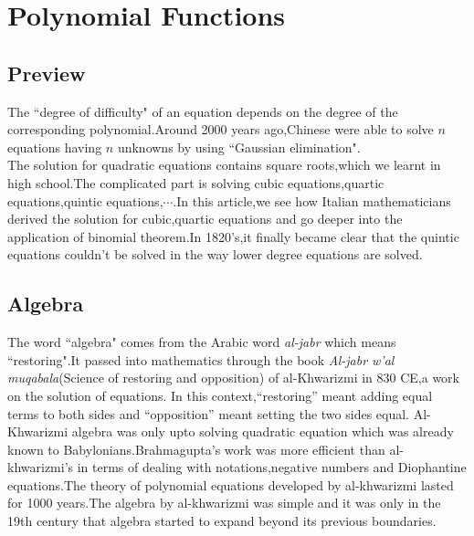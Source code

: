 \documentclass[a4paper,reqno,11pt]{book}
\theoremstyle{plain}%
\theoremstyle{definition}
\begin{document}
\chapter{Polynomial Functions}
\section{Preview}
\noindent The ``degree of difficulty" of an equation depends on the degree of the corresponding polynomial.Around 2000 years ago,Chinese were able to solve $n$ equations having $n$ unknowns by using ``Gaussian elimination".\\
The solution for quadratic equations contains square roots,which we learnt in high school.The complicated part is solving cubic equations,quartic equations,quintic equations,$\cdots$.In this article,we see how Italian mathematicians derived the solution for cubic,quartic equations and go deeper into the application of binomial theorem.In 1820's,it finally became clear that the quintic equations couldn't be solved in the way lower degree equations are solved.
\section{Algebra}
The word ``algebra" comes from the Arabic word \textit{al-jabr} which means ``restoring".It passed into mathematics through the book \textit{Al-jabr w'al muqabala}(Science of restoring and opposition) of al-Khwarizmi in 830 CE,a work on the solution of equations. In this context,``restoring” meant adding equal terms to both sides and ``opposition” meant setting the two sides equal.
Al-Khwarizmi algebra was only upto solving quadratic equation which was already known to Babylonians.Brahmagupta's work was more efficient than al-khwarizmi's in terms of dealing with notations,negative numbers and Diophantine equations.The theory of polynomial equations developed by al-khwarizmi lasted for 1000 years.The algebra by al-khwarizmi was simple and it was only in the 19th century that algebra started to expand beyond its previous boundaries.\\
\end{document}
